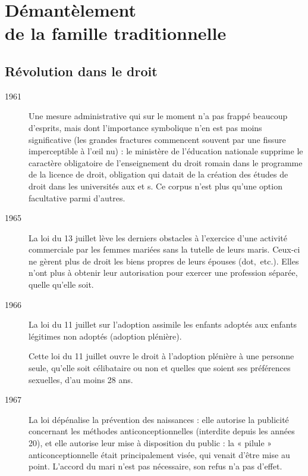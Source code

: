 

\chapter[Démantèlement de la famille traditionnelle]{Démantèlement\\de la famille traditionnelle}


 

\section{Révolution dans le droit}

\begin{description}

\item[1961] Une mesure administrative qui sur le moment n'a pas frappé beaucoup d'esprits, mais dont l'importance symbolique n'en est pas moins significative (les grandes fractures commencent souvent par une fissure imperceptible à l'œil nu) : le ministère de l'éducation nationale supprime le caractère obligatoire de l'enseignement du droit romain dans le programme de la licence de droit, obligation qui datait de la création des études de droit dans les universités aux  et s. Ce corpus n'est plus qu'une option facultative parmi d'autres. 

\item[1965] La loi du 13 juillet lève les derniers obstacles à l'exercice d'une activité commerciale par les femmes mariées sans la tutelle de leurs maris. Ceux-ci ne gèrent plus de droit les biens propres de leurs épouses (dot,~etc.). Elles n'ont plus à obtenir leur autorisation pour exercer une profession séparée, quelle qu'elle soit.

\item[1966] La loi du 11 juillet sur l'adoption assimile les enfants adoptés aux enfants légitimes non adoptés (adoption plénière). 

Cette
loi du 11 juillet ouvre le droit à l'adoption plénière à une personne seule, qu'elle soit célibataire ou non et quelles que soient ses préférences sexuelles, d'au moins 28 ans.

\item[1967] La loi  dépénalise la prévention des naissances : elle autorise la publicité concernant les méthodes anticonceptionnelles (interdite depuis les années 20), et elle autorise leur mise à disposition du public :
la « pilule » anticonceptionnelle était principalement visée,
qui venait d'être mise au point. L'accord du mari n'est pas nécessaire, son refus n'a pas d'effet.


\end{description}
